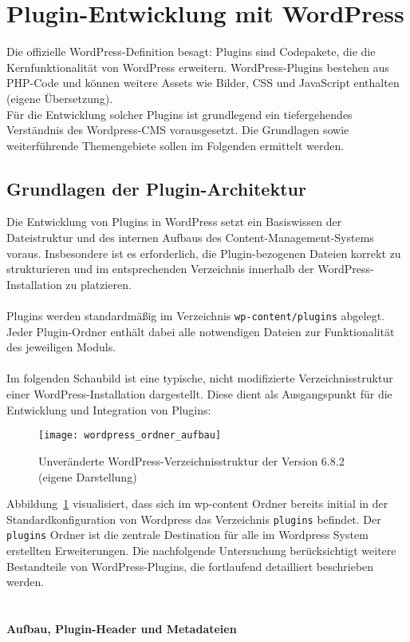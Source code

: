 \section{Plugin-Entwicklung mit WordPress}

Die offizielle WordPress-Definition besagt: \glqq Plugins sind Codepakete, die die Kernfunktionalität von WordPress erweitern.
WordPress-Plugins bestehen aus PHP-Code und können weitere Assets wie Bilder,
CSS und JavaScript enthalten\grqq{} \cite{wordpress2024plugin} (eigene Übersetzung).
\\
Für die Entwicklung solcher Plugins ist grundlegend ein tiefergehendes Verständnis des Wordpress-CMS vorausgesetzt.
Die Grundlagen sowie weiterführende Themengebiete sollen im Folgenden ermittelt werden.



\subsection{Grundlagen der Plugin-Architektur}

Die Entwicklung von Plugins in WordPress setzt ein Basiswissen der Dateistruktur und des internen Aufbaus des Content-Management-Systems voraus.
Insbesondere ist es erforderlich, die Plugin-bezogenen Dateien korrekt zu strukturieren und im entsprechenden Verzeichnis innerhalb der WordPress-Installation zu platzieren.\\\\
Plugins werden standardmäßig im Verzeichnis \texttt{wp-content/plugins} abgelegt.
Jeder Plugin-Ordner enthält dabei alle notwendigen Dateien zur Funktionalität des jeweiligen Moduls.\\\\
Im folgenden Schaubild ist eine typische, nicht modifizierte Verzeichnisstruktur einer WordPress-Installation dargestellt.
Diese dient als Ausgangspunkt für die Entwicklung und Integration von Plugins:

\begin{figure}[tbh]
 \centering
 \texttt{[image: wordpress\_ordner\_aufbau]}
 \caption{Unveränderte WordPress-Verzeichnisstruktur der Version 6.8.2 (eigene Darstellung)}
 \label{fig:wordpress-verzeichnis}
\end{figure}
\newpage
Abbildung~\ref{fig:wordpress-verzeichnis} visualisiert, dass sich im wp-content Ordner bereits initial in der Standardkonfiguration von Wordpress das Verzeichnis \texttt{plugins} befindet.
Der \texttt{plugins} Ordner ist die zentrale Destination für alle im Wordpress System erstellten Erweiterungen.
Die nachfolgende Untersuchung berücksichtigt weitere Bestandteile von WordPress-Plugins, die fortlaufend detailliert beschrieben werden.
\\\\\\
\textbf{Aufbau, Plugin-Header und Metadateien}

